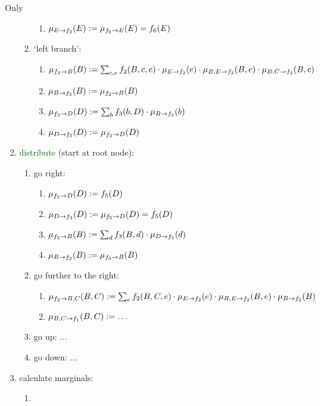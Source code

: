 \begin{frame}{Only}
\begin{enumerate}
\begin{enumerate}
\begin{enumerate}
  \item $\mu_{E\rightarrow f_{2}}(E) := \mu_{f_{6}\rightarrow E}(E) = f_{6}(E)$
  \end{enumerate}
  \item<only@5> `left branch':
  \begin{enumerate}
  \item $\mu_{f_{2}\rightarrow B}(B) := \sum_{c,e} f_{2}(B,c,e) \cdot \mu_{E\rightarrow f_{2}}(e) \cdot \mu_{B,E\rightarrow f_{2}}(B,e) \cdot \mu_{B,C\rightarrow f_{2}}(B,c)$
  \item $\mu_{B\rightarrow f_{3}}(B) := \mu_{f_{2}\rightarrow B}(B)$
  \item $\mu_{f_{3}\rightarrow D}(D) := \sum_{b} f_{3}(b,D) \cdot \mu_{B\rightarrow f_{3}}(b)$
  \item $\mu_{D\rightarrow f_{5}}(D) := \mu_{f_{3}\rightarrow D}(D)$
  \end{enumerate}
 \end{enumerate}
 \item<only@6->  \textcolor{darkgreen}{distribute} (start at root node):
 \begin{enumerate}
  \item<only@7> go right:
  \begin{enumerate}
    \item $\mu_{f_{5}\rightarrow D}(D) := f_{5}(D)$
    \item $\mu_{D\rightarrow f_{3}}(D) := \mu_{f_{5}\rightarrow D}(D) = f_{5}(D)$
    \item $\mu_{f_{3}\rightarrow B}(B) := \sum_{d} f_{3}(B,d) \cdot \mu_{D\rightarrow f_{3}}(d)$  
    \item $\mu_{B\rightarrow f_{2}}(B) := \mu_{f_{3}\rightarrow B}(B)$    
    \end{enumerate}
  \item<only@8-9> go further to the right:
  \begin{enumerate}
  \item $\mu_{f_{2}\rightarrow B,C}(B,C) := \sum_{e} f_{2}(B,C,e) \cdot \mu_{E\rightarrow f_{2}}(e) \cdot \mu_{B,E\rightarrow f_{2}}(B,e) \cdot \mu_{B\rightarrow f_{2}}(B) $
  \item $\mu_{B,C\rightarrow f_{1}}(B,C) := \ldots$ 
  \end{enumerate}
  \item<only@9> go up: $\ldots$
  \item<only@9> go down: $\ldots$
  \end{enumerate}
  \item<only@10> calculate marginals:
  \begin{enumerate}
  \item \begin{align}

\end{align}
\end{enumerate}
\end{enumerate}
\end{frame}
